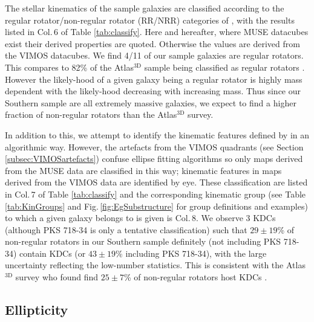 		The stellar kinematics of the sample galaxies are classified according to the regular rotator/non-regular rotator (RR/NRR) categories of \citet{Krajnovic2011}, with the results listed in Col.\,6 of Table \ref{tab:classify}. Here and hereafter, where MUSE datacubes exist their derived properties are quoted. Otherwise the values are derived from the VIMOS datacubes. We find 4/11 of our sample galaxies are regular rotators. This compares to 82\% of the Atlas$^\text{3D}$ sample being classified as regular rotators \citep{Krajnovic2011}. However the likely-hood of a given galaxy being a regular rotator is highly mass dependent with the likely-hood decreasing with increasing mass. Thus since our Southern sample are all extremely massive galaxies, we expect to find a higher fraction of non-regular rotators than the Atlas$^\text{3D}$ survey. 

		In addition to this, we attempt to identify the kinematic features defined by \citet{Krajnovic2011} in an algorithmic way. However, the artefacts from the VIMOS quadrants (see Section \ref{subsec:VIMOSartefacts}) confuse ellipse fitting algorithms so only maps derived from the MUSE data are classified in this way; kinematic features in maps derived from the VIMOS data are identified by eye. These classification are listed in Col.\,7 of Table \ref{tab:classify} and the corresponding kinematic group (see Table \ref{tab:KinGroups} and Fig.\,\ref{fig:EgSubstructure} for group definitions and examples) to which a given galaxy belongs to is given is Col.\,8. We observe 3 KDCs (although PKS 718-34 is only a tentative classification) such that $29\pm19$\% of non-regular rotators in our Southern sample definitely (not including PKS 718-34) contain KDCs (or $43\pm19$\% including PKS 718-34), with the large uncertainty reflecting the low-number statistics. This is consistent with the Atlas$^\text{3D}$ survey who found find $25\pm7$\% of non-regular rotators host KDCs \citep{Krajnovic2011}.


		\subsection{Ellipticity}
			\label{subsec:Ellipticity}

